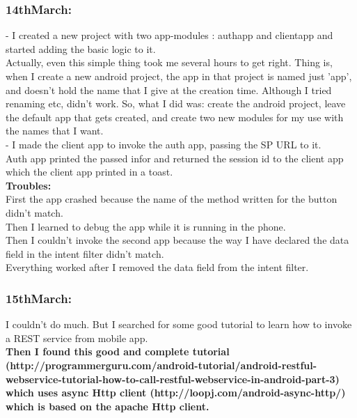 \documentclass[11pt]{article}
\begin{document}
\subsubsection*{14thMarch:}
- I created a new project with two app-modules : authapp and clientapp and started adding the basic logic to it.\\
Actually, even this simple thing took me several hours to get right. Thing is, when I create a new android  project, the app in that project is named 
just 'app', and doesn't hold the name that I give at the creation time. Although I tried renaming etc, didn't work. So, what I did was: create the 
android project, leave the default app that gets created, and create two new modules for my use with the names that I want.\\

- I made the client app to invoke the auth app, passing the SP URL to it.\\
Auth app printed the passed infor and returned the session id to the client app which the client app printed in a toast.\\
 \textbf{Troubles:}\\
 First the app crashed because the name of the method written for the button didn't match.\\
 Then I learned to debug the app while it is running in the phone.\\
 Then I couldn't invoke the second app because the way I have declared the data field in the intent filter didn't match.\\
 Everything worked after I removed the data field from the intent filter.
 
\subsubsection*{15thMarch:}
I couldn't do much. But I searched for some good tutorial to learn how to invoke a REST service from mobile app.\\

\textbf{Then I found this good and complete tutorial 
(http://programmerguru.com/android-tutorial/android-restful-webservice-tutorial-how-to-call-restful-webservice-in-android-part-3) which uses 
async Http client (http://loopj.com/android-async-http/) which is based on the apache Http client.}
\end{document}
